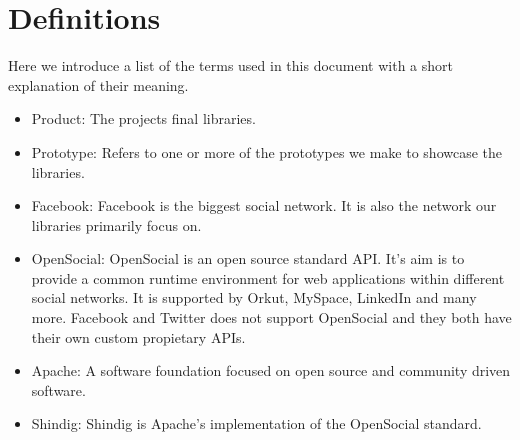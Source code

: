 \section{Definitions}

Here we introduce a list of the terms used in this document with a short explanation of their meaning.

\begin{itemize}
\item{Product}: The projects final libraries. 
\item{Prototype}: Refers to one or more of the prototypes we make to showcase the libraries.
\item{Facebook}: Facebook is the biggest social network. It is also the network our libraries primarily focus on.
\item{OpenSocial}: OpenSocial is an open source standard API. It's aim is to provide a common runtime environment for web applications within different social networks.
It is supported by Orkut, MySpace, LinkedIn and many more. Facebook and Twitter does not support
OpenSocial and they both have their own custom propietary APIs.
\item{Apache}: A software foundation focused on open source and community driven software.
\item{Shindig}: Shindig is Apache's implementation of the OpenSocial standard.
\end{itemize}